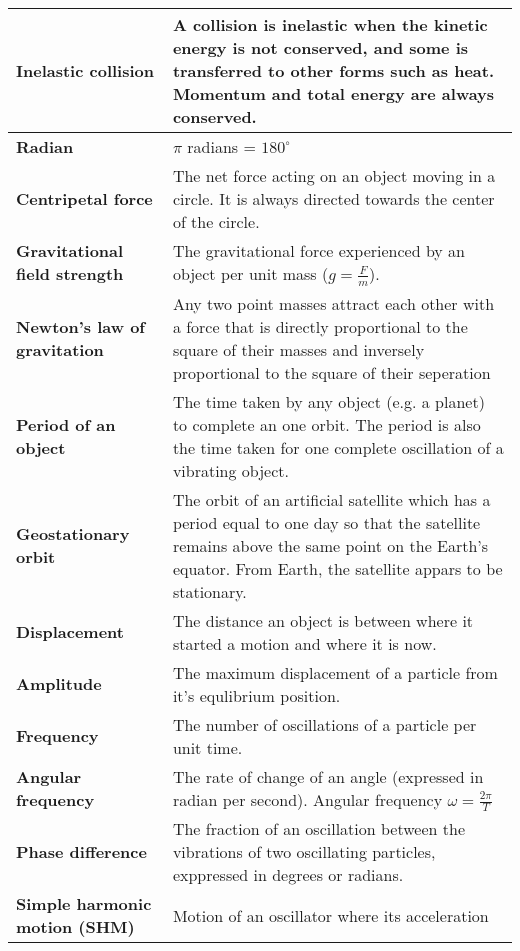 \documentclass{article}
\begin{document}
\begin{longtable}{>{\bf\centering\arraybackslash}p{1in} 
  p{\textwidth-4\tabcolsep-1in}}
  Inelastic collision & A collision is inelastic when the kinetic
    energy is not conserved, and some is transferred to other forms such as
    heat. Momentum and total energy are always conserved.\\ \midrule
  Radian & $\pi$ radians = $180^\circ$\\ %
  Centripetal force & The net force acting on an object moving in a circle. It is always directed towards the center of the circle. \\ \midrule
  Gravitational field strength & The gravitational force 
    experienced by an object per unit mass ($g = \frac{F}{m}$).\\ \midrule
  Newton's law of gravitation & Any two point masses attract each other with a
    force that is directly proportional to the square of their masses and
    inversely proportional to the square of their seperation\\ \midrule
  Period of an object & The time taken by any object (e.g. a planet) to complete
    an one orbit. \newline \newline The period is also the time taken for one
    complete oscillation of a vibrating object.\\ \midrule
  Geostationary orbit & The orbit of an artificial satellite which has a period
    equal to one day so that the satellite remains above the same point on the
    Earth's equator. \newline \newline From Earth, the satellite appars to be
    stationary.\\ \midrule
  Displacement & The distance an object is between where it started a motion and
    where it is now.\\ \midrule
  Amplitude & The maximum displacement of a particle from it's equlibrium
    position.\\ \midrule
  Frequency & The number of oscillations of a particle per unit time.\\ \midrule
  Angular frequency & The rate of change of an angle (expressed in radian per 
    second). \newline \newline Angular frequency $\omega = \frac{2\pi}{T}$\\ 
    \midrule
  Phase difference & The fraction of an oscillation between the vibrations of
    two oscillating particles, exppressed in degrees or radians.\\ \midrule
  Simple harmonic motion (SHM) & Motion of an oscillator where its acceleration

\end{longtable}
\end{document}
